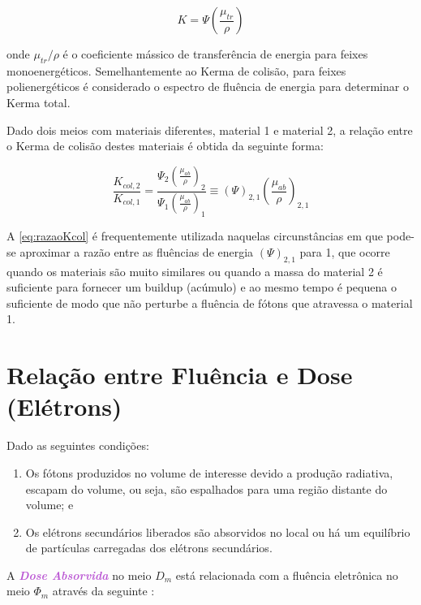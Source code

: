 \documentclass[11pt,a4paper]{article}
\begin{document}
		\begin{equation}
			K = \Psi \left(\frac{\mu_{tr}}{\rho}\right)
		\end{equation}

		\noindent onde $\mu_{tr}/\rho$ é o coeficiente mássico de transferência de energia para feixes monoenergéticos. Semelhantemente ao Kerma de colisão, para feixes polienergéticos é considerado o espectro de fluência de energia para determinar o Kerma total.


		Dado dois meios com materiais diferentes, material 1 e material 2, a relação entre o Kerma de colisão destes materiais é obtida da seguinte forma:

		\begin{equation}
			\frac{K_{col,2}}{K_{col, 1}} = \frac{\Psi_2 \left(\frac{\mu_{ab}}{\rho}\right)_2}{\Psi_1 \left(\frac{\mu_{ab}}{\rho}\right)_1}
			\equiv \left(\Psi \right)_{2,1}\left(\frac{\mu_{ab}}{\rho}\right)_{2,1}
			\label{eq:razaoKcol}
		\end{equation}

		A   \ref{eq:razaoKcol} é frequentemente utilizada naquelas circunstâncias em que pode-se aproximar a razão entre as fluências de energia $(\Psi)_{2,1}$ para 1, que ocorre quando os materiais são muito similares ou quando a massa do material 2 é suficiente para fornecer um buildup (acúmulo) e ao mesmo tempo é pequena o suficiente de modo que não perturbe a fluência de fótons que atravessa o material 1.


	\section{Relação entre Fluência e Dose (Elétrons)}

		Dado as seguintes condições:

		\begin{enumerate}
			\item Os fótons produzidos no volume de interesse devido a produção radiativa, escapam do volume, ou seja, são espalhados para uma região distante do volume; e
			\item Os elétrons secundários liberados são absorvidos no local ou há um equilíbrio de partículas carregadas dos elétrons secundários.
		\end{enumerate}

		\noindent A \textbf{\textit{\textcolor{MediumOrchid}{Dose Absorvida}}} no meio $D_{m}$ está relacionada com a fluência eletrônica no meio $\Phi_{m}$ através da seguinte  :
\end{document}
